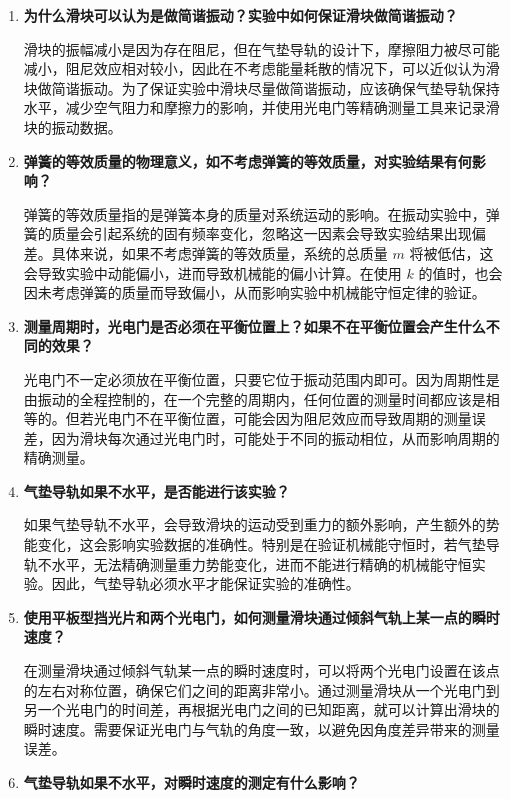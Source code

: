 \documentclass[UTF8]{article}
\theoremstyle{MyLineTheoremStyle} %
\theoremstyle{MyBlockTheoremStyle} %
\theoremstyle{MySubsubsectionStyle} %
\begin{document}
\begin{enumerate}
    \item \textbf{为什么滑块可以认为是做简谐振动？实验中如何保证滑块做简谐振动？}
    
    滑块的振幅减小是因为存在阻尼，但在气垫导轨的设计下，摩擦阻力被尽可能减小，阻尼效应相对较小，因此在不考虑能量耗散的情况下，可以近似认为滑块做简谐振动。为了保证实验中滑块尽量做简谐振动，应该确保气垫导轨保持水平，减少空气阻力和摩擦力的影响，并使用光电门等精确测量工具来记录滑块的振动数据。

    \item \textbf{弹簧的等效质量的物理意义，如不考虑弹簧的等效质量，对实验结果有何影响？}
    
    弹簧的等效质量指的是弹簧本身的质量对系统运动的影响。在振动实验中，弹簧的质量会引起系统的固有频率变化，忽略这一因素会导致实验结果出现偏差。具体来说，如果不考虑弹簧的等效质量，系统的总质量 \(m\) 将被低估，这会导致实验中动能偏小，进而导致机械能的偏小计算。在使用 \(k\) 的值时，也会因未考虑弹簧的质量而导致偏小，从而影响实验中机械能守恒定律的验证。

    \item \textbf{测量周期时，光电门是否必须在平衡位置上？如果不在平衡位置会产生什么不同的效果？}
    
    光电门不一定必须放在平衡位置，只要它位于振动范围内即可。因为周期性是由振动的全程控制的，在一个完整的周期内，任何位置的测量时间都应该是相等的。但若光电门不在平衡位置，可能会因为阻尼效应而导致周期的测量误差，因为滑块每次通过光电门时，可能处于不同的振动相位，从而影响周期的精确测量。

    \item \textbf{气垫导轨如果不水平，是否能进行该实验？}
    
    如果气垫导轨不水平，会导致滑块的运动受到重力的额外影响，产生额外的势能变化，这会影响实验数据的准确性。特别是在验证机械能守恒时，若气垫导轨不水平，无法精确测量重力势能变化，进而不能进行精确的机械能守恒实验。因此，气垫导轨必须水平才能保证实验的准确性。

    \item \textbf{使用平板型挡光片和两个光电门，如何测量滑块通过倾斜气轨上某一点的瞬时速度？}
    
    在测量滑块通过倾斜气轨某一点的瞬时速度时，可以将两个光电门设置在该点的左右对称位置，确保它们之间的距离非常小。通过测量滑块从一个光电门到另一个光电门的时间差，再根据光电门之间的已知距离，就可以计算出滑块的瞬时速度。需要保证光电门与气轨的角度一致，以避免因角度差异带来的测量误差。

    \item \textbf{气垫导轨如果不水平，对瞬时速度的测定有什么影响？}
    

\end{enumerate}
\end{document}
